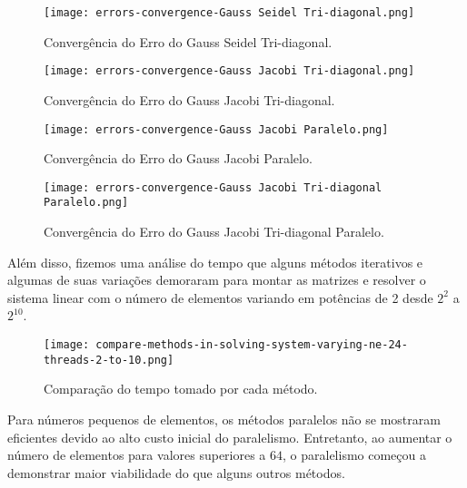 \begin{minipage}{0.45\textwidth}
  \begin{figure}[H]
    \centering
    \texttt{[image: errors-convergence-Gauss Seidel Tri-diagonal.png]}
    \caption{Convergência do Erro do Gauss Seidel Tri-diagonal.}
  \end{figure}
\end{minipage}
\hfill
\begin{minipage}{0.45\textwidth}
  \begin{figure}[H]
    \centering
    \texttt{[image: errors-convergence-Gauss Jacobi Tri-diagonal.png]}
    \caption{Convergência do Erro do Gauss Jacobi Tri-diagonal.}
  \end{figure}
\end{minipage}

\begin{minipage}{0.45\textwidth}
  \begin{figure}[H]
    \centering
    \texttt{[image: errors-convergence-Gauss Jacobi Paralelo.png]}
    \caption{Convergência do Erro do Gauss Jacobi Paralelo.}
  \end{figure}
\end{minipage}
\hfill
\begin{minipage}{0.45\textwidth}
  \begin{figure}[H]
    \centering
    \texttt{[image: errors-convergence-Gauss Jacobi Tri-diagonal Paralelo.png]}
    \caption{Convergência do Erro do Gauss Jacobi Tri-diagonal Paralelo.}
  \end{figure}
\end{minipage}

Além disso, fizemos uma análise do tempo que alguns métodos iterativos e algumas de suas variações demoraram para montar as matrizes e resolver o sistema linear com o número de elementos variando em potências de 2 desde $2^2$ a $2^{10}$.

\begin{figure}[H]
  \centering
  \texttt{[image: compare-methods-in-solving-system-varying-ne-24-threads-2-to-10.png]}
  \caption{Comparação do tempo tomado por cada método.}
\end{figure}

Para números pequenos de elementos, os métodos paralelos não se mostraram eficientes devido ao alto custo inicial do paralelismo. Entretanto, ao aumentar o número de elementos para valores superiores a $64$, o paralelismo começou a demonstrar maior viabilidade do que alguns outros métodos.

